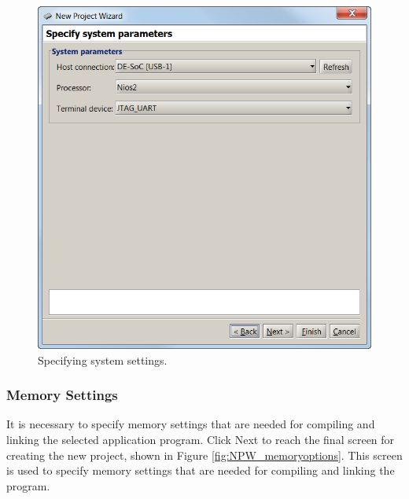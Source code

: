 \documentclass[11pt, twoside, pdftex]{article}
\begin{document}
\begin{figure}[H]
   \begin{center}
      \includegraphics[scale=1]{screenshots/figure11.png}
   \end{center}
   \caption{Specifying system settings.} 
   \label{fig:NPW_systemparameters}
\end{figure}


\subsubsection{Memory Settings}

It is necessary to specify memory settings that are needed for
compiling and linking the selected application program.
Click {\sf Next} to reach the final screen for creating the new
project, shown in Figure \ref{fig:NPW_memoryoptions}. This screen is used to specify memory settings that are needed for compiling and linking the
program.
\end{document}
